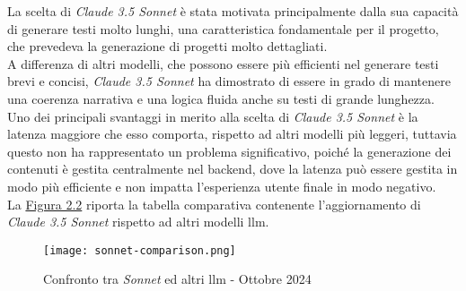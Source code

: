 \noindent La scelta di \textit{Claude 3.5 Sonnet} è stata motivata principalmente dalla sua capacità di generare testi molto lunghi, una caratteristica fondamentale per il progetto, che prevedeva la generazione di progetti molto dettagliati.\\
A differenza di altri modelli, che possono essere più efficienti nel generare testi brevi e concisi, \textit{Claude 3.5 Sonnet} ha dimostrato di essere in grado di mantenere una coerenza narrativa e una logica fluida anche su testi di grande lunghezza.\\

\noindent Uno dei principali svantaggi in merito alla scelta di \textit{Claude 3.5 Sonnet} è la latenza maggiore che esso comporta, rispetto ad altri modelli più leggeri,
tuttavia questo non ha rappresentato un problema significativo, poiché la generazione dei contenuti è gestita centralmente nel \gls{backend}, dove la latenza può essere gestita in modo più efficiente e non impatta l'esperienza utente finale in modo negativo.\\

\noindent La {\hyperref[fig:sonnet-comparison]{Figura 2.2}} riporta la tabella comparativa contenente l'aggiornamento di \textit{Claude 3.5 Sonnet} rispetto ad altri modelli \gls{llm}.

\begin{figure}[H]
    \centering
    \texttt{[image: sonnet-comparison.png]}
    \caption{Confronto tra \textit{Sonnet} ed altri \gls{llm} - Ottobre 2024}
    \cite{site:updated-sonnet}
    \label{fig:sonnet-comparison}
\end{figure}